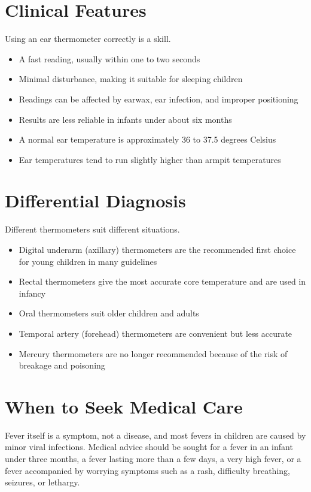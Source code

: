 \section*{Clinical Features}
Using an ear thermometer correctly is a skill.
\begin{itemize}
    \item A fast reading, usually within one to two seconds
    \item Minimal disturbance, making it suitable for sleeping children
    \item Readings can be affected by earwax, ear infection, and improper positioning
    \item Results are less reliable in infants under about six months
    \item A normal ear temperature is approximately 36 to 37.5 degrees Celsius
    \item Ear temperatures tend to run slightly higher than armpit temperatures
\end{itemize}

\section*{Differential Diagnosis}
Different thermometers suit different situations.
\begin{itemize}
    \item Digital underarm (axillary) thermometers are the recommended first choice for young children in many guidelines
    \item Rectal thermometers give the most accurate core temperature and are used in infancy
    \item Oral thermometers suit older children and adults
    \item Temporal artery (forehead) thermometers are convenient but less accurate
    \item Mercury thermometers are no longer recommended because of the risk of breakage and poisoning
\end{itemize}

\section*{When to Seek Medical Care}
Fever itself is a symptom, not a disease, and most fevers in children are caused by minor viral infections. Medical advice should be sought for a fever in an infant under three months, a fever lasting more than a few days, a very high fever, or a fever accompanied by worrying symptoms such as a rash, difficulty breathing, seizures, or lethargy.

